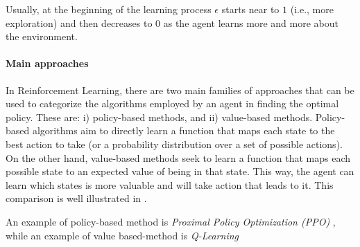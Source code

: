 \documentclass[12pt,a4paper,openright,twoside]{book}
\begin{document}
    Usually, at the beginning of the learning process $\epsilon$ starts near to $1$ (i.e., more exploration) and then decreases
    to $0$ as the agent learns more and more about the environment. 

\paragraph{Main approaches}

In Reinforcement Learning, there are two main families of approaches that can be used to categorize the 
    algorithms employed by an agent in finding the optimal policy. These are: 
    i) policy-based methods, and 
    ii) value-based methods.
    Policy-based algorithms aim to directly learn a function that maps each state to the best action to take 
    (or a probability distribution over a set of possible actions). On the other hand, value-based methods 
    seek to learn a function that maps each possible state to an expected value of being in that state. 
    This way, the agent can learn which states is more valuable and will take action that leads to it. 
    This comparison is well illustrated in .

An example of policy-based method is \emph{Proximal Policy Optimization (PPO)} \cite{ppo}, while an example of 
    value based-method is \emph{Q-Learning} \cite{QL}
\end{document}
